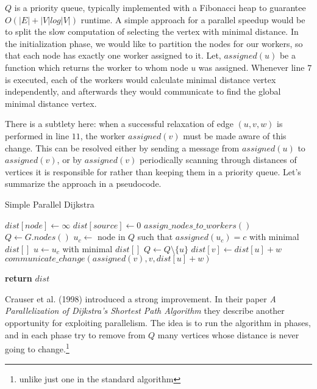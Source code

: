 \documentclass[12pt,a4paper,twoside,openright]{report}
\begin{document}
$Q$ is a priority queue, typically implemented with a Fibonacci heap to guarantee $O(|E| + |V| log |V|)$ runtime. A simple approach for a parallel speedup would be to split the slow computation of selecting the vertex with minimal distance. In the initialization phase, we would like to partition the nodes for our workers, so that each node has exactly one worker assigned to it. Let, $assigned(u)$ be a function which returns the worker to whom node $u$ was assigned. Whenever line $7$ is executed, each of the workers would calculate minimal distance vertex independently, and afterwards they would communicate to find the global minimal distance vertex.

There is a subtlety here: when a successful relaxation of edge $(u,v,w)$ is performed in line $11$, the worker $assigned(v)$ must be made aware of this change. This can be resolved either by sending a message from $assigned(u)$ to $assigned(v)$, or by $assigned(v)$ periodically scanning through distances of vertices it is responsible for rather than keeping them in a priority queue. Let's summarize the approach in a pseudocode.

\begin{algorithm}
\caption{Simple Parallel Dijkstra}\label{pdijkstra}
\begin{algorithmic}[1]
    \State $dist[node] \gets \infty$
\EndFor
\State $dist[source] \gets 0$
\State $assign\_nodes\_to\_workers()$
\State $Q \gets G.nodes()$
        \State $u_c \gets$ node in $Q$ such that $assigned(u_c) = c$ with minimal $dist[]$
        \EndFor
        \State $u \gets u_c$ with minimal $dist[]$
        \State $Q \gets Q \setminus \{u\}$
            \State $dist[v] \gets dist[u] + w$
            \State $communicate\_change(assigned(v), v, dist[u] + w)$
        \EndIf
      \EndFor
    \EndWhile
    
    
\State \textbf{return} $dist$
\EndProcedure
\end{algorithmic}
\end{algorithm}

Crauser et al. (1998) \cite{dijkstra} introduced a strong improvement. In their paper \textit{A Parallelization of Dijkstra's Shortest Path Algorithm} they describe another opportunity for exploiting parallelism. The idea is to run the algorithm in phases, and in each phase try to remove from $Q$ many vertices whose distance is never going to change.\footnote{unlike just one in the standard algorithm}
\end{document}

